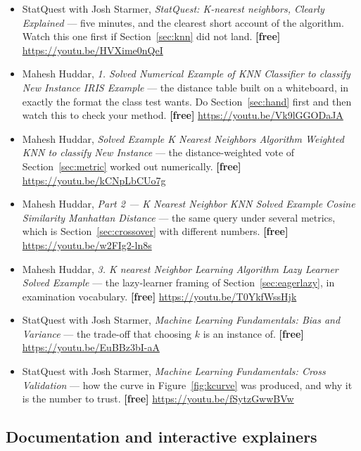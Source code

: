 \documentclass[11pt]{article}
\begin{document}
\begin{itemize}[leftmargin=*]
  \item StatQuest with Josh Starmer, \emph{StatQuest: K-nearest neighbors,
    Clearly Explained} --- five minutes, and the clearest short account of the
    algorithm. Watch this one first if Section~\ref{sec:knn} did not land.
    \textbf{[free]} \url{https://youtu.be/HVXime0nQeI}
  \item Mahesh Huddar, \emph{1. Solved Numerical Example of KNN Classifier to
    classify New Instance IRIS Example} --- the distance table built on a
    whiteboard, in exactly the format the class test wants. Do
    Section~\ref{sec:hand} first and then watch this to check your method.
    \textbf{[free]} \url{https://youtu.be/Vk9lGGODaJA}
  \item Mahesh Huddar, \emph{Solved Example K Nearest Neighbors Algorithm
    Weighted KNN to classify New Instance} --- the distance-weighted vote of
    Section~\ref{sec:metric} worked out numerically. \textbf{[free]}
    \url{https://youtu.be/kCNpLbCUo7g}
  \item Mahesh Huddar, \emph{Part 2 --- K Nearest Neighbor KNN Solved Example
    Cosine Similarity Manhattan Distance} --- the same query under several
    metrics, which is Section~\ref{sec:crossover} with different numbers.
    \textbf{[free]} \url{https://youtu.be/w2FIg2-ln8s}
  \item Mahesh Huddar, \emph{3. K nearest Neighbor Learning Algorithm Lazy
    Learner Solved Example} --- the lazy-learner framing of
    Section~\ref{sec:eagerlazy}, in examination vocabulary. \textbf{[free]}
    \url{https://youtu.be/T0YkfWssHjk}
  \item StatQuest with Josh Starmer, \emph{Machine Learning Fundamentals: Bias
    and Variance} --- the trade-off that choosing $k$ is an instance of.
    \textbf{[free]} \url{https://youtu.be/EuBBz3bI-aA}
  \item StatQuest with Josh Starmer, \emph{Machine Learning Fundamentals: Cross
    Validation} --- how the curve in Figure~\ref{fig:kcurve} was produced, and
    why it is the number to trust. \textbf{[free]}
    \url{https://youtu.be/fSytzGwwBVw}
\end{itemize}

\subsection*{Documentation and interactive explainers}
\end{document}
